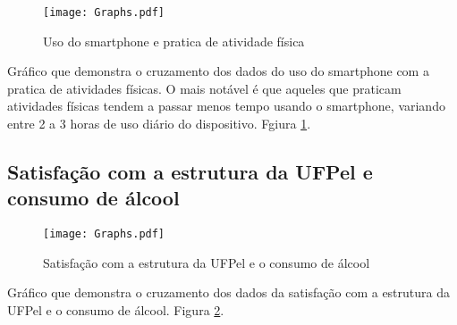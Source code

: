 \documentclass[11pt]{scrartcl} %
\begin{document}
\begin{figure}[h]
  \centering
  \texttt{[image: Graphs.pdf]}
  \label{fig:graph12}
  \caption{Uso do smartphone e pratica de atividade física}
\end{figure}

Gráfico que demonstra o cruzamento dos dados do uso do smartphone com a pratica de atividades físicas. O mais notável é que aqueles que praticam atividades físicas tendem a passar menos tempo usando o smartphone, variando entre 2 a 3 horas de uso diário do dispositivo. Fgiura \ref{fig:graph12}.

\clearpage

\subsection{Satisfação com a estrutura da UFPel e consumo de álcool}

\begin{figure}[h]
  \centering
  \texttt{[image: Graphs.pdf]}
  \label{fig:graph13}
  \caption{Satisfação com a estrutura da UFPel e o consumo de álcool}
\end{figure}

Gráfico que demonstra o cruzamento dos dados da satisfação com a estrutura da UFPel e o consumo de álcool. Figura \ref{fig:graph13}.
\end{document}
